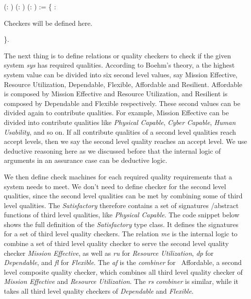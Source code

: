\documentclass[conference]{IEEEtran}
\begin{document}
\begin{coqdoccode}
\coqdocnoindent
{}  (: ) (: ) (: ) := \{\coqdoceol
\coqdocindent{1.00em}
: \coqdoceol
\coqdoceol \coqdocnoindent 
\begin{coqdoccomment}
\coqdocnoindent
Checkers will be defined here.
\end{coqdoccomment} 
\coqdoceol \coqdocnoindent
\}.\coqdoceol
\end{coqdoccode}

The next thing is to define relations or quality checkers to check if the given system {\em sys} has required qualities. According to Boehm's theory, a the highest system value can be divided into six second level values, say Mission Effective, Resource Utilization, Dependable, Flexible, Affordable and Resilient. Affordable is composed by Mission Effective and Resource Utilization, and Resilient is composed by Dependable and Flexible respectively. These second values can be divided again to contribute qualities. For example, Mission Effective can be divided into contribute qualities like \emph{Physical Capable}, \emph{Cyber Capable}, \emph{Human Usability}, and so on. If all contribute qualities of a second level qualities reach accept levels, then we say the second level quality reaches an accept level. We use deductive reasoning here as we discussed before that the internal logic of arguments in an assurance case can be deductive logic.

We then define check machines for each required quality requirements that a system needs to meet. We don't need to define checker for the second level qualities, since the second level qualities can be met by combining some of third level qualities. The {\em Satisfactory} therefore contains a set of signatures /abstract functions of third level qualities, like \emph{Physical Capable}. The code snippet below shows the full definition of the {\em Satisfactory} type class. It defines the signatures for a set of third level quality checkers. The relation {\em me} is the internal logic to combine a set of third level quality checker to serve the second level quality checker \emph{Mission Effective}, as well as {\em ru} for \emph{Resource Utilization}, {\em dp} for \emph{Dependable}, and {\em fl} for {\em Flexible}. The {\em af} is the {\em combiner} for {\ Affordable}, a second level composite quality checker, which combines all third level quality checker of \emph{Mission Effective} and \emph{Resource Utilization}. The {\em rs} {\em combiner} is similar, while it takes all third level quality checkers of {\em Dependable} and {\em Flexible}.
\end{document}
